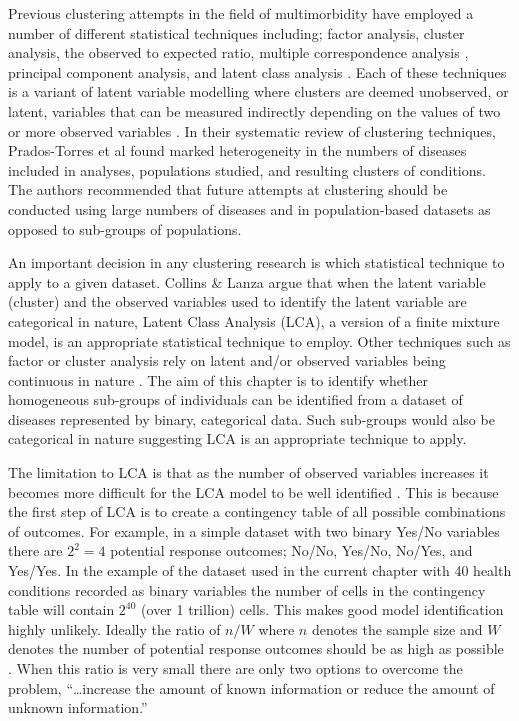 \documentclass[12pt,]{report}
\begin{document}
Previous clustering attempts in the field of multimorbidity have
employed a number of different statistical techniques including; factor
analysis, cluster analysis, the observed to expected ratio, multiple
correspondence analysis \citep{RN98}, principal component analysis, and
latent class analysis \citep{RN109}. Each of these techniques is a
variant of latent variable modelling where clusters are deemed
unobserved, or latent, variables that can be measured indirectly
depending on the values of two or more observed variables \citep{RN291}.
In their systematic review of clustering techniques, Prados-Torres et al
\citeyearpar{RN98} found marked heterogeneity in the numbers of diseases
included in analyses, populations studied, and resulting clusters of
conditions. The authors recommended that future attempts at clustering
should be conducted using large numbers of diseases and in
population-based datasets as opposed to sub-groups of populations.

An important decision in any clustering research is which statistical
technique to apply to a given dataset. Collins \& Lanza
\citeyearpar{RN291} argue that when the latent variable (cluster) and
the observed variables used to identify the latent variable are
categorical in nature, Latent Class Analysis (LCA), a version of a
finite mixture model, is an appropriate statistical technique to employ.
Other techniques such as factor or cluster analysis rely on latent
and/or observed variables being continuous in nature \citep{RN291}. The
aim of this chapter is to identify whether homogeneous sub-groups of
individuals can be identified from a dataset of diseases represented by
binary, categorical data. Such sub-groups would also be categorical in
nature suggesting LCA is an appropriate technique to apply.

The limitation to LCA is that as the number of observed variables
increases it becomes more difficult for the LCA model to be well
identified \citep{RN291}. This is because the first step of LCA is to
create a contingency table of all possible combinations of outcomes. For
example, in a simple dataset with two binary Yes/No variables there are
\(2^{2} = 4\) potential response outcomes; No/No, Yes/No, No/Yes, and
Yes/Yes. In the example of the dataset used in the current chapter with
40 health conditions recorded as binary variables the number of cells in
the contingency table will contain \(2^{40}\) (over 1 trillion) cells.
This makes good model identification highly unlikely. Ideally the ratio
of \(n/W\) where \(n\) denotes the sample size and \(W\) denotes the
number of potential response outcomes should be as high as possible
\citep{RN291}. When this ratio is very small there are only two options
to overcome the problem, ``\ldots{}increase the amount of known
information or reduce the amount of unknown information.'' \citep[
:93]{RN291}
\end{document}
